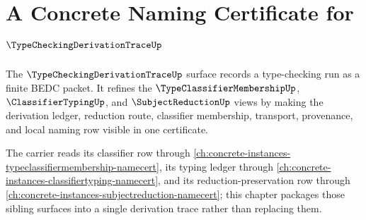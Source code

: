 \chapter{A Concrete Naming Certificate for $\TypeCheckingDerivationTraceUp$}
\label{ch:concrete-instances-typecheckingderivationtrace-namecert}

The $\TypeCheckingDerivationTraceUp$ surface records a type-checking run as a finite BEDC packet. It refines the $\TypeClassifierMembershipUp$, $\ClassifierTypingUp$, and $\SubjectReductionUp$ views by making the derivation ledger, reduction route, classifier membership, transport, provenance, and local naming row visible in one certificate.

The carrier reads its classifier row through \autoref{ch:concrete-instances-typeclassifiermembership-namecert}, its typing ledger through \autoref{ch:concrete-instances-classifiertyping-namecert}, and its reduction-preservation row through \autoref{ch:concrete-instances-subjectreduction-namecert}; this chapter packages those sibling surfaces into a single derivation trace rather than replacing them.

